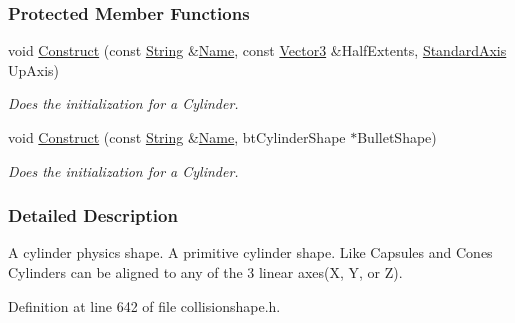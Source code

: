 \subsubsection*{Protected Member Functions}
\begin{DoxyCompactItemize}
\item 
void \hyperlink{classMezzanine_1_1CylinderCollisionShape_ab7b1d796b02acd1a0ca35f1f609e8901}{Construct} (const \hyperlink{namespaceMezzanine_acf9fcc130e6ebf08e3d8491aebcf1c86}{String} \&\hyperlink{classMezzanine_1_1CollisionShape_aac524c5c56fa4d158bc071f8aecfbe79}{Name}, const \hyperlink{classMezzanine_1_1Vector3}{Vector3} \&HalfExtents, \hyperlink{namespaceMezzanine_ab41a00a8c6a47b576dc987ec34e16ba1}{StandardAxis} UpAxis)
\begin{DoxyCompactList}\small\item\em Does the initialization for a Cylinder. \item\end{DoxyCompactList}\item 
void \hyperlink{classMezzanine_1_1CylinderCollisionShape_a34ed7408114b3863a14f2d8ff1b1b4d7}{Construct} (const \hyperlink{namespaceMezzanine_acf9fcc130e6ebf08e3d8491aebcf1c86}{String} \&\hyperlink{classMezzanine_1_1CollisionShape_aac524c5c56fa4d158bc071f8aecfbe79}{Name}, btCylinderShape $\ast$BulletShape)
\begin{DoxyCompactList}\small\item\em Does the initialization for a Cylinder. \item\end{DoxyCompactList}\end{DoxyCompactItemize}


\subsubsection{Detailed Description}
A cylinder physics shape. A primitive cylinder shape. Like Capsules and Cones Cylinders can be aligned to any of the 3 linear axes(X, Y, or Z). 

Definition at line 642 of file collisionshape.h.



